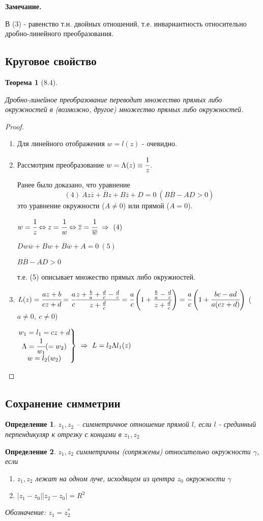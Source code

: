 \documentclass[draft]{report}
\newcommand{\forcenewline}{$\phantom{\mbox{newline}}$}
\newcommand{\then}{\ \Rightarrow\ }
\newcommand{\LRA}{\Leftrightarrow}
\renewcommand{\bar}{\overline}
\newcommand{\g}{\gamma}
\renewcommand{\L}{\Lambda}
\newcommand{\z}{\bar{z}}
\newcommand{\bsys}[1]{\left.\begin{matrix}#1\end{matrix}\right\}}
\newcommand{\opr}[1]{\begin{opred}#1\end{opred}}
\newtheorem*{theor}{Теорема}
\newtheorem*{opred}{Определение}
\theoremstyle{remark}
\begin{document}
{\bfseries Замечание.}

В (3) - равенство т.н. двойных отношений, т.е. инвариантность относительно дробно-линейного преобразования.

\subsection{Круговое свойство}

\begin{theor}[8.4]
\forcenewline

Дробно-линейное преобразование переводит множество прямых либо окружностей в (возможно, другое) множество прямых либо окружностей.
\end{theor}
\begin{proof}
\forcenewline
\begin{enumerate}
\item Для линейного отображения $w=l(z)$ - очевидно.
\item Рассмотрим преобразование $w=\Lambda(z)\equiv \cfrac 1z$.

Ранее было доказано, что уравнение
$$
(4)\ Az\z+\bar{B}z+B\z+D=0\ (B\bar{B}-AD>0)
$$
это уравнение окружности ($A\neq0$) или прямой ($A=0$).

$w=\cfrac 1z \LRA z=\cfrac 1w \LRA \bar{z}=\cfrac {1}{\bar{w}} \then (4)$

$Dw\bar{w}+Bw+\bar{B}\bar{w}+A=0\ (5)$

$B\bar{B}-AD>0$

т.е. (5) описывает множество прямых либо окружностей.
\item $L(z)=\cfrac{az+b}{cz+d}=\cfrac ac \cfrac {z+\frac ba+\frac dc-\frac dc}{z+\frac dc}=\cfrac ac\left(1+\cfrac{\frac ba-\frac dc}{z+\frac dc}\right)=\cfrac ac\left(1+\cfrac{bc-ad}{a(cz+d)}\right)$ ($a\neq 0,\ c\neq 0$)

$\bsys{w_1=l_1=cz+d \\ \L=\cfrac {1}{w_1}(=w_2) \\ w=l_2(w_2)}\then L=l_2\L l_1(z)$
\end{enumerate}
\end{proof}

\subsection{Сохранение симметрии}

\opr{$z_1, z_2$ -- симметричное отношение прямой $l$, если $l$ - срединный перпендикуляр к отрезку с концами в $z_1, z_2$}
\opr{$z_1, z_2$ симметричны (сопряжены) относительно окружности $\g$, если
\begin{enumerate}
\item $z_1, z_2$ лежат на одном луче, исходящем из центра $z_0$ окружности $\g$
\item $|z_1-z_0||z_2-z_0|=R^2$
\end{enumerate}
Обозначение: $z_1=z_2^*$}
\end{document}
